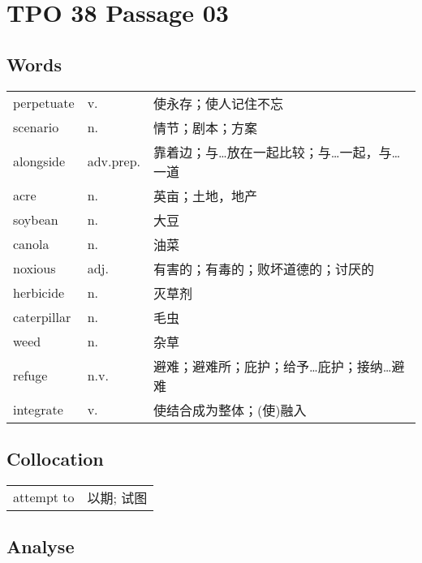 \section{TPO 38 Passage 03}

\subsection{Words}

\begin{tabular}{lll}
    perpetuate  & v.        & 使永存；使人记住不忘             \\
    scenario    & n.        & 情节；剧本；方案               \\
    alongside   & adv.prep. & 靠着边；与…放在一起比较；与…一起，与…一道 \\
    acre        & n.        & 英亩；土地，地产               \\
    soybean     & n.        & 大豆                     \\
    canola      & n.        & 油菜                     \\
    noxious     & adj.      & 有害的；有毒的；败坏道德的；讨厌的      \\
    herbicide   & n.        & 灭草剂                    \\
    caterpillar & n.        & 毛虫                     \\
    weed        & n.        & 杂草                     \\
    refuge      & n.v.      & 避难；避难所；庇护；给予…庇护；接纳…避难  \\
    integrate   & v.        & 使结合成为整体；(使)融入          \\
\end{tabular}

\subsection{Collocation}

\begin{tabular}{ll}
    attempt to & 以期; 试图 \\
\end{tabular}

\subsection{Analyse}

